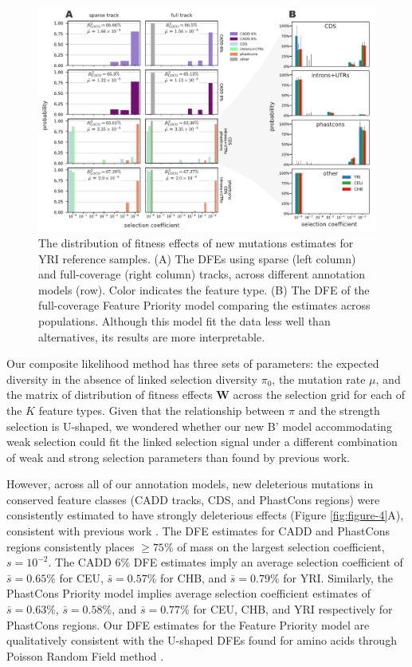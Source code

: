 \documentclass[11pt]{article}
\begin{document}
\begin{figure}[htbp] \centering
    \includegraphics[width=\textwidth]{figures/figure_4.pdf} 

    \caption{The distribution of fitness effects of new mutations estimates for
        YRI reference samples. (A) The DFEs using sparse (left column) and
        full-coverage (right column) tracks, across different annotation models
        (row). Color indicates the feature type. (B) The DFE of the
    full-coverage Feature Priority model comparing the estimates across
populations. Although this model fit the data less well than alternatives, its
results are more interpretable.}

  \label{fig:figure-3}
\end{figure}

Our composite likelihood method has three sets of parameters: the expected
diversity in the absence of linked selection diversity $\pi_0$, the mutation
rate $\mu$, and the matrix of distribution of fitness effects $\mathbf{W}$
across the selection grid for each of the $K$ feature types. Given that the
relationship between $\pi$ and the strength selection is U-shaped, we wondered
whether our new B' model accommodating weak selection could fit the linked
selection signal under a different combination of weak and strong selection
parameters than found by previous work.

However, across all of our annotation models, new deleterious mutations in
conserved feature classes (CADD tracks, CDS, and PhastCons regions) were
consistently estimated to have strongly deleterious effects (Figure
\ref{fig:figure-4}A), consistent with previous work
\parencite{McVicker2009-ax,Murphy2022-sj}. The DFE estimates for CADD and
PhastCons regions consistently places $\ge 75\%$ of mass on the largest
selection coefficient, $s=10^{-2}$. The CADD 6\% DFE estimates imply an average
selection coefficient of $\bar{s} = 0.65\%$ for CEU, $\bar{s} = 0.57\%$ for
CHB, and $\bar{s} = 0.79\%$ for YRI. Similarly, the PhastCons Priority model
implies average selection coefficient estimates of $\bar{s} = 0.63\%$, $\bar{s}
= 0.58\%$, and $\bar{s}= 0.77\%$ for CEU, CHB, and YRI respectively for
PhastCons regions. Our DFE estimates for the Feature Priority model are
qualitatively consistent with the U-shaped DFEs found for amino acids through
Poisson Random Field method \parencite{Boyko2008-tj}.
\end{document}
